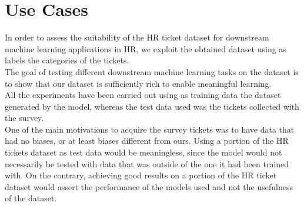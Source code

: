 \chapter{Use Cases}
\label{sec:Use_Cases}

In order to assess the suitability of the HR ticket dataset for downstream machine learning applications in HR, we exploit the obtained dataset using as labels the categories of the tickets. \\
The goal of testing different downstream machine learning tasks on the dataset is to show that our dataset is sufficiently rich to enable meaningful learning. \\
All the experiments have been carried out using as training data the dataset generated by the model, whereas the test data used was the tickets collected with the survey. \\ 
One of the main motivations to acquire the survey tickets was to have data that had no biases, or at least biases different from ours. Using a portion of the HR tickets dataset as test data would be meaningless, since the model would not necessarily be tested with data that was outside of the one it had been trained with. On the contrary, achieving good results on a portion of the HR ticket dataset would assert the performance of the models used and not the usefulness of the dataset.



